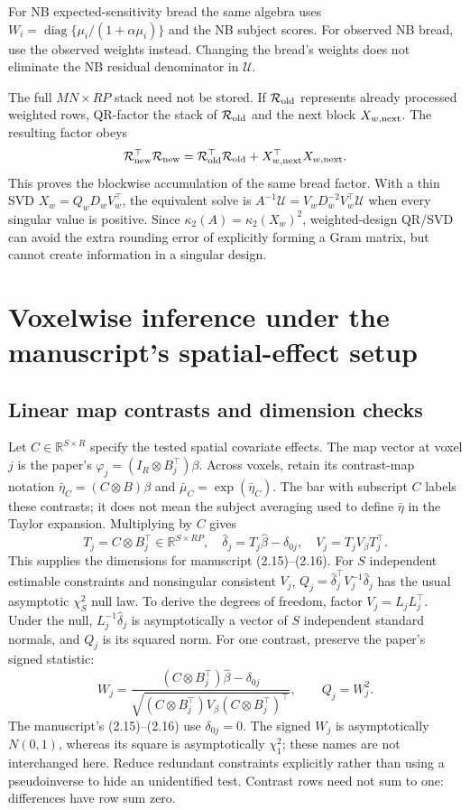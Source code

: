 \documentclass[11pt,a4paper]{article}
\newcommand{\R}{\mathbb R}
\newcommand{\diag}{\operatorname{diag}}
\numberwithin{equation}{section}
\begin{document}
For NB expected-sensitivity bread the same algebra uses
$W_i=\diag\{\mu_i/(1+\alpha\mu_i)\}$ and the NB subject scores.
For observed NB bread, use the observed weights instead.
Changing the bread's weights does not eliminate the NB residual
denominator in $\mathcal U$.

The full $MN\times RP$ stack need not be stored.
If $\mathcal R_{\rm old}$ represents already processed weighted
rows, QR-factor the stack of $\mathcal R_{\rm old}$ and the next
block $X_{w,\rm next}$. The resulting factor obeys
\[
 \mathcal R_{\rm new}^\top\mathcal R_{\rm new}
 =\mathcal R_{\rm old}^\top\mathcal R_{\rm old}
                   +X_{w,\rm next}^\top X_{w,\rm next}.
\]
This proves the blockwise accumulation of the same bread factor.
With a thin SVD $X_w=Q_wD_wV_w^\top$, the equivalent solve is
$A^{-1}\mathcal U=V_wD_w^{-2}V_w^\top\mathcal U$ when every
singular value is positive.
Since $\kappa_2(A)=\kappa_2(X_w)^2$, weighted-design QR/SVD can
avoid the extra rounding error of explicitly forming a Gram
matrix, but cannot create information in a singular design.

\section{Voxelwise inference under the manuscript's spatial-effect setup}
\label{lesion-inference}

\subsection{Linear map contrasts and dimension checks}
Let $C\in\R^{S\times R}$ specify the tested spatial covariate effects.
The map vector at voxel $j$ is
the paper's $\varphi_j=(I_R\otimes B_j^\top)\beta$.
Across voxels, retain its contrast-map notation
$\bar\eta_C=(C\otimes B)\beta$ and
$\bar\mu_C=\exp(\bar\eta_C)$.
The bar with subscript $C$ labels these contrasts; it does not
mean the subject averaging used to define $\bar\eta$ in the
Taylor expansion.
Multiplying by $C$ gives
\[
 T_j=C\otimes B_j^\top\in\R^{S\times RP},\quad
 \widehat\delta_j=T_j\widehat\beta-\delta_{0j},\quad
 V_j=T_j V_\beta T_j^\top.
\]
This supplies the dimensions for manuscript (2.15)--(2.16).
For $S$ independent estimable constraints and nonsingular consistent
$V_j$, $Q_j=\widehat\delta_j^\top V_j^{-1}\widehat\delta_j$
has the usual asymptotic $\chi_S^2$ null law.
To derive the degrees of freedom, factor $V_j=L_jL_j^\top$.
Under the null, $L_j^{-1}\widehat\delta_j$ is asymptotically a
vector of $S$ independent standard normals, and $Q_j$ is its
squared norm.
For one contrast, preserve the paper's signed statistic:
\[
 W_j=\frac{(C\otimes B_j^\top)\widehat\beta-\delta_{0j}}
 {\sqrt{(C\otimes B_j^\top)V_\beta(C\otimes B_j^\top)^\top}},
 \qquad Q_j=W_j^2 .
\]
The manuscript's (2.15)--(2.16) use $\delta_{0j}=0$.
The signed $W_j$ is asymptotically $N(0,1)$, whereas its square
is asymptotically $\chi_1^2$; these names are not interchanged here.
Reduce redundant constraints explicitly rather than using a
pseudoinverse to hide an unidentified test.
Contrast rows need not sum to one: differences have row sum zero.
\end{document}
